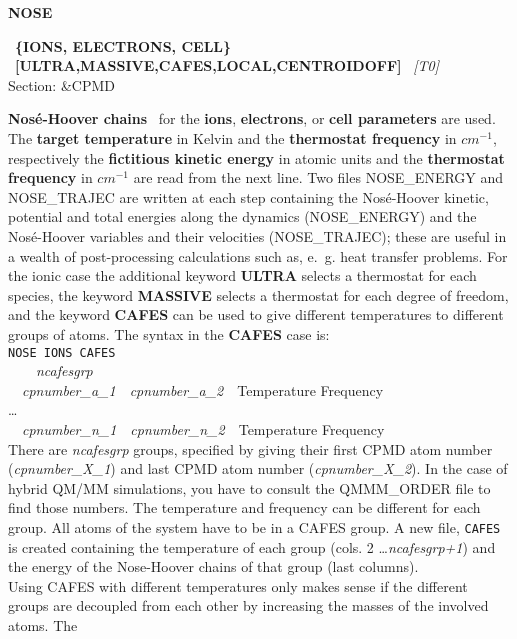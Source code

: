 \documentclass[twoside,10pt,titlepage,a4paper]{article}
\newcommand{\reflabel}[1]{\hypertarget{#1}}
\newcommand{\reflabel}[1]{\label{#1}}
\newcommand{\keyword}[5]{%
\vspace{1.0cm}
\begin{minipage}{15cm}
\reflabel{#1}{\textbf{\large #1}}%
\index{#1}%
\ \textbf{#2}%
\ \textbf{#3}%
\ \textit{#4}%
     \hfill\\\smallskip
     {Section: #5}
     \hfill\\\smallskip\vskip 10pt
\end{minipage}
}%
\newcommand{\desc}[1]{%
   \hspace*{\fill} \parbox{130mm}{\sloppy
                          {#1}%
                             }
     \hfill\\\smallskip
   }%
\newcommand{\desc}[1]{#1\vspace{1ex}}
\begin{document}
\keyword{NOSE}{\{IONS, ELECTRONS, CELL\}}{[ULTRA,MASSIVE,CAFES,LOCAL,CENTROIDOFF]}{[T0]}{\&CPMD}
  \desc{{\bf Nos\'e-Hoover chains}~\cite{Nose84,Hoover85} for the {\bf
      ions}, {\bf electrons}, or {\bf cell parameters} are used.\\
      The {\bf target temperature} in Kelvin and
      the {\bf thermostat frequency}
      in $cm^{-1}$, respectively the {\bf fictitious kinetic
      energy} in atomic units and the {\bf thermostat frequency}
      in $cm^{-1}$ are read from the next line.
      Two files NOSE\_ENERGY and NOSE\_TRAJEC are written at each step containing 
      the Nos\'e-Hoover kinetic, potential and total energies along the dynamics
      (NOSE\_ENERGY) and the Nos\'e-Hoover variables and their velocities (NOSE\_TRAJEC); 
      these are useful in a wealth of post-processing calculations such as, e.~g. 
      heat transfer problems\cite{heat1,heat2}.
      For the ionic case the additional
      keyword {\bf ULTRA} selects a thermostat for each species,
      the keyword {\bf MASSIVE} selects a thermostat for each degree of
      freedom, and the keyword {\bf CAFES} can be used to give different
      temperatures to different groups of atoms\cite{cafes02}.
      The syntax in the {\bf CAFES} case is:\\[2ex]
      \texttt{NOSE IONS CAFES}\\
      ~~~~\textsl{ncafesgrp}\\
      ~~\textsl{cpnumber\_a\_1}~~\textsl{cpnumber\_a\_2}~~Temperature Frequency\\
      \dots\\
      ~~\textsl{cpnumber\_n\_1}~~\textsl{cpnumber\_n\_2}~~Temperature Frequency\\[2ex]
      There are \textsl{ncafesgrp} groups, specified by giving their
      first CPMD atom number (\textsl{cpnumber\_X\_1}) and last CPMD atom
      number (\textsl{cpnumber\_X\_2}). In the case of hybrid QM/MM
      simulations, you have to consult the QMMM\_ORDER file to find those
      numbers. The temperature and frequency can be different for each
      group. All atoms of the system have to be in a CAFES group.
      A new file, \texttt{CAFES} is created containing the temperature
      of each group (cols. 2 \dots \textsl{ncafesgrp+1}) and the energy
      of the Nose-Hoover chains of that group (last columns).\\
      Using CAFES with different temperatures only makes sense if the
      different groups are decoupled from each other by increasing the
      masses of the involved atoms. The
}
\end{document}
